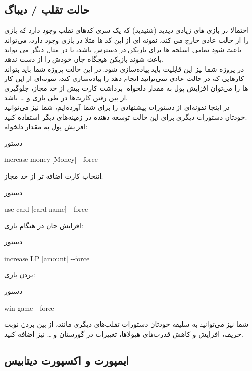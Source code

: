 \documentclass[]{article}
\begin{document}
\subsection*{{\titr حالت تقلب / دیباگ}}
احتمالا در بازی های زیادی دیدید (شنیدید) که یک سری کدهای تقلب وجود دارد که 
بازی را از حالت عادی خارج می کند، نمونه ای از این کد ها مثلا در بازی 
وجود دارد، می‌تواند باعث شود تمامی اسلحه ها برای بازیکن در دسترس باشد، یا 
در 
مثال دیگر می تواند باعث شوند بازیکن هیچگاه جان خودش را از دست ندهد.
\\
در پروژه شما نیز این قابلیت باید پیاده‌سازی شود. در این حالت پروژه شما باید 
بتواند کارهایی که در حالت عادی نمی‌توانید انجام دهد را  پیاده‌سازی کند، 
نمونه‌ای از این کار ها را می‌توان افزایش پول به مقدار دلخواه، برداشت کارت 
بیش 
از حد مجاز، جلوگیری از بین رفتن کارت‌ها در طی بازی و … باشد.
\\
در اینجا نمونه‌ای از دستورات پیشنهادی را برای شما آورده‌ایم، شما نیز می‌توانید 
خودتان دستورات دیگری برای این حالت توسعه دهنده در زمینه‌های دیگر استفاده 
کنید. 
\\
افزایش پول به مقدار دلخواه:
\begin{mybox}[colback=yellow]{دستور}
	\begin{latin}	
		increase money  [Money] -{}-force
	\end{latin}
\end{mybox}
انتخاب کارت اضافه تر از حد مجاز:
\begin{mybox}[colback=yellow]{دستور}
	\begin{latin}	
		use card [card name] -{}-force
	\end{latin}
\end{mybox}
    افزایش جان در هنگام بازی:
\begin{mybox}[colback=yellow]{دستور}
	\begin{latin}	
		increase LP [amount] -{}-force
	\end{latin}
\end{mybox}
    بردن بازی:
\begin{mybox}[colback=yellow]{دستور}
	\begin{latin}	
		win game -{}-force
	\end{latin}
\end{mybox}
شما نیز می‌توانید به سلیقه خودتان دستورات تقلب‌های دیگری مانند، از بین بردن 
نوبت حریف، افزایش و کاهش قدرت‌های هیولاها، تغییرات در گورستان و … نیز اضافه 
کنید.

\subsection*{{\titr ایمپورت و اکسپورت دیتابیس }}
\end{document}
